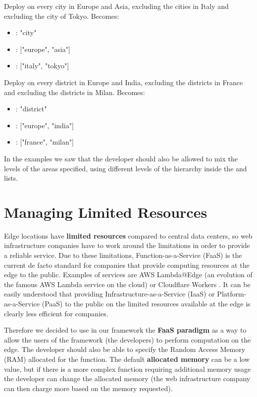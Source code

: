 \begin{example}
Deploy on every city in Europe and Asia, excluding the cities in Italy and excluding the city of Tokyo.
Becomes:
\begin{itemize}
    \item {}: "city"
    \item {}: ["europe", "asia"]
     \item {}: ["italy", "tokyo"]
\end{itemize}
\end{example}

\begin{example}
Deploy on every district in Europe and India, excluding the districts in France and excluding the districts in Milan.
Becomes:
\begin{itemize}
    \item {}: "district"
    \item {}: ["europe", "india"]
     \item {}: ["france", "milan"]
\end{itemize}
\end{example}

In the examples we saw that the developer should also be allowed to mix the levels of the areas specified, using different levels of the hierarchy inside the  and  lists.


\section{Managing Limited Resources}
Edge locations have \textbf{limited resources} compared to central data centers, so web infrastructure companies have to work around the limitations in order to provide a reliable service.
Due to these limitations, Function-as-a-Service (FaaS) is the current de facto standard for companies that provide computing resources at the edge to the public. Examples of services are AWS Lambda@Edge (an evolution of the famous AWS Lambda service on the cloud) \cite{aws-lambda-at-edge} or Cloudflare Workers \cite{cloudflare-workers}. It can be easily understood that providing Infrastructure-as-a-Service (IaaS) or Platform-as-a-Service (PaaS) to the public on the limited resources available at the edge is clearly less efficient for companies.

Therefore we decided to use in our framework the \textbf{FaaS paradigm} as a way to allow the users of the framework (the developers) to perform computation on the edge. The developer should also be able to specify the Random Access Memory (RAM) allocated for the function. The default \textbf{allocated memory} can be a low value, but if there is a more complex function requiring additional memory usage the developer can change the allocated memory (the web infrastructure company can then charge more based on the memory requested).

